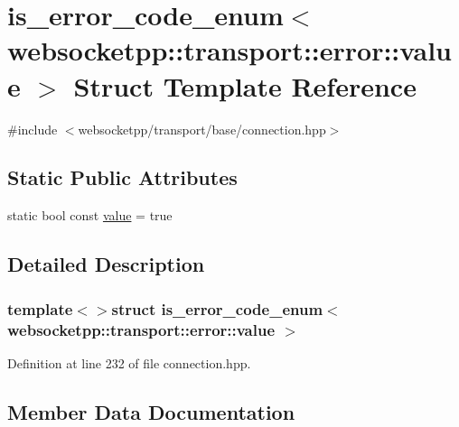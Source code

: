 \hypertarget{structis__error__code__enum_3_01websocketpp_1_1transport_1_1error_1_1value_01_4}{}\section{is\+\_\+error\+\_\+code\+\_\+enum$<$ websocketpp\+:\+:transport\+:\+:error\+:\+:value $>$ Struct Template Reference}
\label{structis__error__code__enum_3_01websocketpp_1_1transport_1_1error_1_1value_01_4}


{\ttfamily \#include $<$websocketpp/transport/base/connection.\+hpp$>$}

\subsection*{Static Public Attributes}
\begin{DoxyCompactItemize}
\item 
static bool const \hyperlink{structis__error__code__enum_3_01websocketpp_1_1transport_1_1error_1_1value_01_4_a75058d7048e16ee883f1b54b4e5bcbbf}{value} = true
\end{DoxyCompactItemize}


\subsection{Detailed Description}
\subsubsection*{template$<$$>$struct is\+\_\+error\+\_\+code\+\_\+enum$<$ websocketpp\+::transport\+::error\+::value $>$}



Definition at line 232 of file connection.\+hpp.



\subsection{Member Data Documentation}
\hypertarget{structis__error__code__enum_3_01websocketpp_1_1transport_1_1error_1_1value_01_4_a75058d7048e16ee883f1b54b4e5bcbbf}{}

